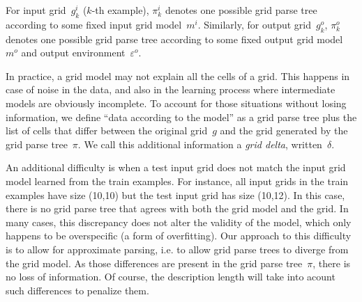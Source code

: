 \documentclass[a4paper]{llncs}
\newcommand{\KILL}[1]{}
\newcommand{\nat}{\mathbb{N}}
\begin{document}
For input grid~$g^i_k$ ($k$-th example), $\pi^i_k$ denotes one
possible grid parse tree according to some fixed input grid
model~$m^i$. Similarly, for output grid~$g^o_k$, $\pi^o_k$ denotes one
possible grid parse tree according to some fixed output grid
model~$m^o$ and output environment~$\varepsilon^o$.

In practice, a grid model may not explain all the cells of a
grid. This happens in case of noise in the data, and also in the
learning process where intermediate models are obviously
incomplete. To account for those situations without losing
information, we define ``data according to the model'' as a grid parse
tree plus the list of cells that differ between the original grid~$g$
and the grid generated by the grid parse tree~$\pi$. We call this
additional information a {\em grid delta}, written~$\delta$.
\KILL{Formally, a grid
delta is a set of triples~$(i,j,c) \in \nat \times \nat \times C$
stating that the cell at coordinates~$(i,j)$ has color~$c$ in~$g$,
which is different from the color specified by~$\pi$.}

An additional difficulty is when a test input grid does not match the
input grid model learned from the train examples. For instance, all
input grids in the train examples have size (10,10) but the test
input grid has size (10,12). In this case, there is no grid parse tree
that agrees with both the grid model and the grid. In many cases, this
discrepancy does not alter the validity of the model, which only
happens to be overspecific (a form of overfitting).
%
Our approach to this difficulty is to allow for approximate parsing,
i.e. to allow grid parse trees to diverge from the grid model. As
those differences are present in the grid parse tree~$\pi$, there is
no loss of information. Of course, the description length will take
into acount such differences to penalize them.
\end{document}
